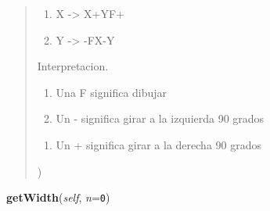 \begin{boxedminipage}{\funcwidth}
\begin{quote}
{\begin{itemize}
          \begin{enumerate}

          \setlength{\parskip}{0.5ex}
            \item X -{\textgreater} X+YF+

            \item Y -{\textgreater} -FX-Y

          \end{enumerate}

      \end{itemize}

      Interpretacion.

      \begin{enumerate}

      \setlength{\parskip}{0.5ex}
        \item Una F significa dibujar

        \item Un - significa girar a la izquierda 90 grados

      \end{enumerate}

      \begin{enumerate}

      \setlength{\parskip}{0.5ex}
        \item Un + significa girar a la derecha 90 grados

      \end{enumerate})}

      \end{quote}

    \end{boxedminipage}

    \label{FractalZE:dragon:Dragon:getWidth}

    \vspace{0.5ex}

\hspace{.8\funcindent}\begin{boxedminipage}{\funcwidth}

    \raggedright \textbf{getWidth}(\textit{self}, \textit{n}={\tt 0})

\setlength{\parskip}{2ex}
\setlength{\parskip}{1ex}
    \end{boxedminipage}

    \label{FractalZE:dragon:Dragon:getHeight}


